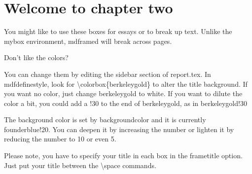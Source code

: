 \chapter{Welcome to chapter two}
\pagestyle{fancy}

\lipsum[9]



\begin{mdframed}[style=custom,frametitle=\colorbox{berkeleygold}{\space Put your title here \space}]

You might like to use these boxes for essays or to break up text. Unlike the mybox environment, mdframed will break across pages.

Don't like the colors?

You can change them by editing the sidebar section of report.tex. In mdfdefinestyle, look for \textbackslash colorbox\{berkeleygold\} to alter the title background. If you want no color, just change berkeleygold to white. If you want to dilute the color a bit, you could add a !30 to the end of berkeleygold, as in berkeleygold!30

The background color is set by backgroundcolor and it is currently founderblue!20. You can deepen it by increasing the number or lighten it by reducing the number to 10 or even 5.

\end{mdframed}


\begin{mdframed}[style=custom,frametitle=\colorbox{berkeleygold}{\space This is my second box \space}]

Please note, you have to specify your title in each box in the frametitle option. Just put your title between the \textbackslash space commands.

\end{mdframed}

